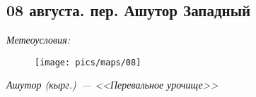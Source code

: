 \subsection{08 августа. пер. Ашутор Западный}
\textit{Метеоусловия: }

\begin{figure}[h!]
	\centering
	\texttt{[image: pics/maps/08]}
	\label{fig:08}
\end{figure}

\textit{Ашутор (кырг.)~--- <<Перевальное урочище>>}


\clearpage